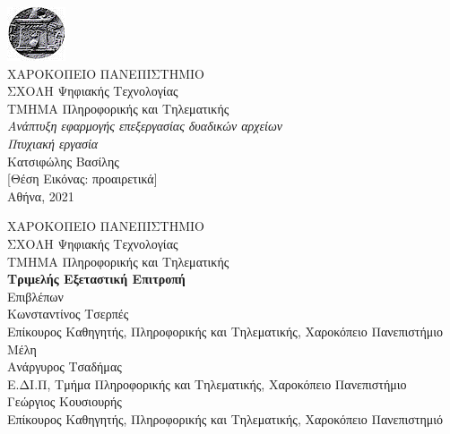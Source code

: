 \thispagestyle{plain}
  \begin{center}
    \includegraphics[scale=1]{"hua.png"}\\
    \vspace{1cm}
    {\huge ΧΑΡΟΚΟΠΕΙΟ ΠΑΝΕΠΙΣΤΗΜΙΟ}\\
        \vspace{1cm}
    {\Large ΣΧΟΛΗ Ψηφιακής Τεχνολογίας}\\
    {\Large ΤΜΗΜΑ Πληροφορικής και Τηλεματικής}\\
        \vspace{5cm}
    {\large \textit{Ανάπτυξη εφαρμογής επεξεργασίας δυαδικών αρχείων}}\\
       \vspace{1cm} 
  \textit{Πτυχιακή εργασία}\\
    {\large Κατσιφώλης Βασίλης}\\
    
    \vspace{5cm}
    [Θέση Εικόνας: προαιρετικά]\\
    \vspace{5cm}
    Αθήνα, 2021\\

  \end{center}
\pagebreak

  \begin{center}
    {\huge ΧΑΡΟΚΟΠΕΙΟ ΠΑΝΕΠΙΣΤΗΜΙΟ}\\
    \vspace{4cm}
    ΣΧΟΛΗ Ψηφιακής Τεχνολογίας \\
    ΤΜΗΜΑ Πληροφορικής και Τηλεματικής\\
    \vspace{4cm}
    \textbf{Τριμελής Εξεταστική Επιτροπή}\\
    
 	Επιβλέπων\\
    Κωνσταντίνος Τσερπές\\
    Επίκουρος Καθηγητής, Πληροφορικής και Τηλεματικής, Χαροκόπειο Πανεπιστήμιο\\[1\baselineskip]
    Μέλη\\
    Ανάργυρος Τσαδήμας\\
    Ε.ΔΙ.Π, Τμήμα Πληροφορικής και Τηλεματικής, Χαροκόπειο Πανεπιστήμιο\\[1\baselineskip]
    Γεώργιος Κουσιουρής\\
    Επίκουρος Καθηγητής, Πληροφορικής και Τηλεματικής, Χαροκόπειο Πανεπιστημιό\\
   
  \end{center}
\pagebreak

